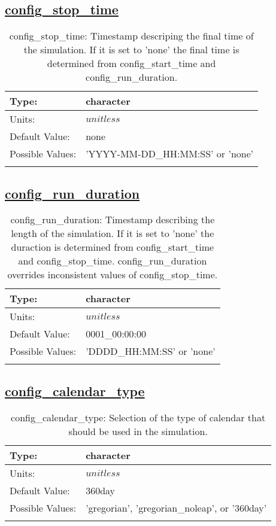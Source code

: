 \subsection[config\_stop\_time]{\hyperref[sec:nm_tab_time_management]{config\_stop\_time}}
\label{subsec:nm_sec_config_stop_time}
\begin{center}
\begin{longtable}{| p{2.0in} | p{4.0in} |}
    \hline
    Type: & character \\
    \hline
    Units: & $unitless$ \\
    \hline
    Default Value: & none \\
    \hline
    Possible Values: & 'YYYY-MM-DD\_HH:MM:SS' or 'none' \\
    \hline
    \caption{config\_stop\_time: Timestamp descriping the final time of the simulation. If it is set to 'none' the final time is determined from config\_start\_time and config\_run\_duration.}
\end{longtable}
\end{center}
\subsection[config\_run\_duration]{\hyperref[sec:nm_tab_time_management]{config\_run\_duration}}
\label{subsec:nm_sec_config_run_duration}
\begin{center}
\begin{longtable}{| p{2.0in} | p{4.0in} |}
    \hline
    Type: & character \\
    \hline
    Units: & $unitless$ \\
    \hline
    Default Value: & 0001\_00:00:00 \\
    \hline
    Possible Values: & 'DDDD\_HH:MM:SS' or 'none' \\
    \hline
    \caption{config\_run\_duration: Timestamp describing the length of the simulation. If it is set to 'none' the duraction is determined from config\_start\_time and config\_stop\_time. config\_run\_duration overrides inconsistent values of config\_stop\_time.}
\end{longtable}
\end{center}
\subsection[config\_calendar\_type]{\hyperref[sec:nm_tab_time_management]{config\_calendar\_type}}
\label{subsec:nm_sec_config_calendar_type}
\begin{center}
\begin{longtable}{| p{2.0in} | p{4.0in} |}
    \hline
    Type: & character \\
    \hline
    Units: & $unitless$ \\
    \hline
    Default Value: & 360day \\
    \hline
    Possible Values: & 'gregorian', 'gregorian\_noleap', or '360day' \\
    \hline
    \caption{config\_calendar\_type: Selection of the type of calendar that should be used in the simulation.}
\end{longtable}
\end{center}
